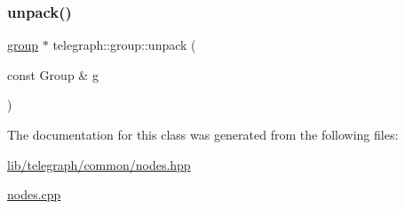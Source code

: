 \subsubsection{\texorpdfstring{unpack()}{unpack()}}
{\footnotesize\ttfamily \hyperlink{classtelegraph_1_1group}{group} $\ast$ telegraph\+::group\+::unpack (\begin{DoxyParamCaption}\item[{const Group \&}]{g }\end{DoxyParamCaption})\hspace{0.3cm}{\ttfamily [static]}}



The documentation for this class was generated from the following files\+:\begin{DoxyCompactItemize}
\item 
\hyperlink{lib_2telegraph_2common_2nodes_8hpp}{lib/telegraph/common/nodes.\+hpp}\item 
\hyperlink{nodes_8cpp}{nodes.\+cpp}\end{DoxyCompactItemize}

